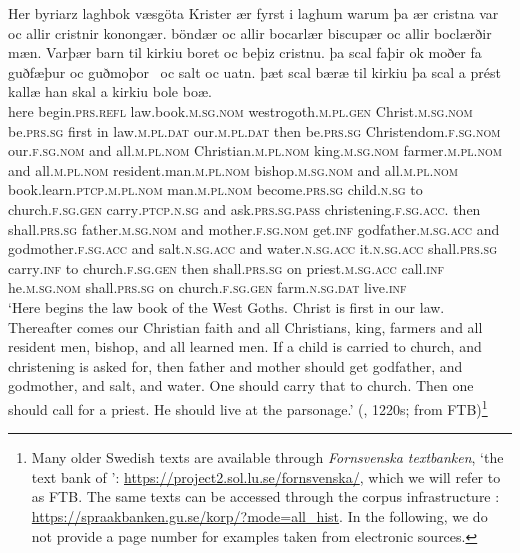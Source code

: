 \documentclass[output=paper]{langscibook}
\begin{document}
\ea    \label{ex:intro:2}
\gll  Her   byriarz                 laghbok                     væsgöta Krister               ær           fyrst   i     laghum           warum           þa ær           cristna                       var                  oc   allir cristnir                   konongær.         böndær               oc   allir bocarlær                       biscupær               oc     allir boclærðir                       mæn.               Varþær       barn           til kirkiu                 boret                 oc   beþiz                   cristnu. þa     scal         faþir           ok   moðer           fa guðfæþur         oc    guðmoþor~      oc   salt         oc   uatn. þæt           scal        bæræ      til   kirkiu         þa   scal a   prést                 kallæ   han                 skal               a     kirkiu bole                       boæ.\\
here   begin.\textsc{prs.refl}     law.book.\textsc{m.sg.nom}     westrogoth.\textsc{m.pl.gen} Christ.\textsc{m.sg.nom}   be.\textsc{prs.sg}     first   in   law\textsc{.m.pl.dat}   our\textsc{.m.pl.dat}   then be.\textsc{prs.sg} Christendom\textsc{.f.sg.nom}   our\textsc{.f.sg.nom}   and   all.\textsc{m.pl.nom} Christian.\textsc{m.pl.nom}   king.\textsc{m.sg.nom}  farmer.\textsc{m.pl.nom}    and  all.\textsc{m.pl.nom} resident.man.\textsc{m.pl.nom}    bishop.\textsc{m.sg.nom}   and    all.\textsc{m.pl.nom} book.learn.\textsc{ptcp}.\textsc{m.pl.nom}   man.\textsc{m.pl.nom}   become.\textsc{prs.sg}     child\textsc{.n.sg}   to  church\textsc{.f.sg.gen}   carry\textsc{.ptcp.n.sg}  and ask.\textsc{prs.sg.pass}   christening\textsc{.f.sg.acc.} then   shall\textsc{.prs.sg}   father\textsc{.m.sg.nom}   and   mother\textsc{.f.sg.nom}   get.\textsc{inf} godfather\textsc{.m.sg.acc} and godmother\textsc{.f.sg.acc}   and salt.\textsc{n.sg.acc}   and   water\textsc{.n.sg.acc} it.\textsc{n.sg.acc}   shall\textsc{.prs.sg}   carry\textsc{.inf}     to   church\textsc{.f.sg.gen}   then   shall\textsc{.prs.sg} on priest\textsc{.m.sg.acc}   call\textsc{.inf}   he\textsc{.m.sg.nom}    shall\textsc{.prs.sg}     on   church\textsc{.f.sg.gen} farm.\textsc{n.sg.dat}         live\textsc{.inf}\\
\glt ‘Here begins the law book of the West Goths. Christ is first in our law. Thereafter comes our Christian faith and all Christians, king, farmers and all resident men, bishop, and all learned men. If a child is carried to church, and christening is asked for, then father and mother should get godfather, and godmother, and salt, and water. One should carry that to church. Then one should call for a priest. He should live at the parsonage.’ (, 1220s; from FTB)\footnote{Many older Swedish texts are available through \textit{Fornsvenska textbanken}, ‘the text bank of ’: \url{https://project2.sol.lu.se/fornsvenska/}, which we will refer to as FTB. The same texts can be accessed through the corpus infrastructure  \citep{BorinEtAl2012}: \url{https://spraakbanken.gu.se/korp/?mode=all_hist}. In the following, we do not provide a page number for examples taken from electronic sources.}
\z
\end{document}
